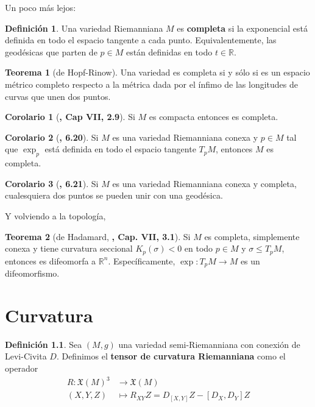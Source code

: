 \documentclass[spanish]{book}
\theoremstyle{definition}
\newtheorem*{defn}{Definición}
\newtheorem*{teo}{Teorema}
\newtheorem*{coro}{Corolario}
\newcommand{\R}{\mathbb{R}}
\newcommand{\X}{\mathfrak{X}}
\begin{document}
	Un poco más lejos:
	
	\begin{defn}
		Una variedad Riemanniana $M$ es \textbf{completa} si la exponencial está definida en todo el espacio tangente a cada punto. Equivalentemente, las geodésicas que parten de $p\in M$ están definidas en todo $t\in\R$.
	\end{defn}
	
	\begin{teo}[de Hopf-Rinow]
		Una variedad es completa si y sólo si es un espacio métrico completo respecto a la métrica dada por el ínfimo de las longitudes de curvas que unen dos puntos.
	\end{teo}
	
	\begin{coro}[\cite{DoCarmo}\textbf{, Cap VII, 2.9}]
		Si $M$ es compacta entonces es completa.
	\end{coro}
	
	\begin{coro}[\cite{Lee-riem}\textbf{, 6.20}]
		Si $M$ es una variedad Riemanniana conexa y $p\in M$ tal que $\exp_p$ está definida en todo el espacio tangente $T_pM$, entonces $M$ es completa.
	\end{coro}
	\begin{coro}[\cite{Lee-riem}\textbf{, 6.21}]
		Si $M$ es una variedad Riemanniana conexa y completa, cualesquiera dos puntos se pueden unir con una geodésica.
	\end{coro}
	
	Y volviendo a la topología,
	
	\begin{teo}[de Hadamard, \cite{DoCarmo}\textbf{, Cap. VII, 3.1}]
		Si $M$ es completa, simplemente conexa y tiene curvatura seccional $K_p(\sigma)<0$ en todo $p\in M$ y $\sigma\leq T_pM$, entonces es difeomorfa a $\R^n$. Específicamente, $\exp: T_pM\to M$ es un difeomorfismo.
	\end{teo}
	
	\chapter{Curvatura}
	\begin{defn}
		Sea $(M,g)$ una variedad semi-Riemanniana con conexión de Levi-Civita $D$. Definimos el \textbf{tensor de curvatura Riemanniana} como el operador
		\begin{align*}
			R:\X(M)^3&\to\X(M)\\
			(X,Y,Z)&\mapsto R_{XY}Z=D_{[X,Y]}Z-[D_X,D_Y]Z
		\end{align*}
	\end{defn}
	
\end{document}
